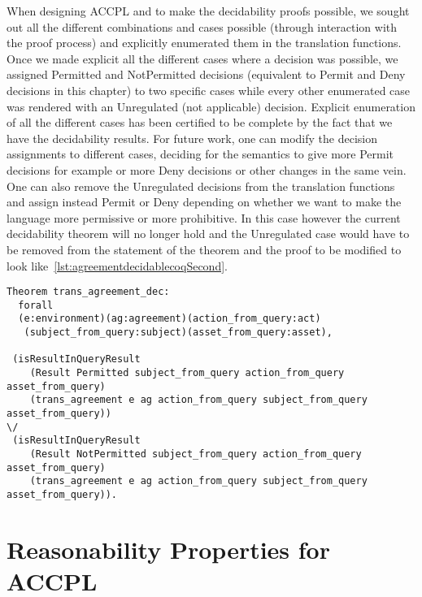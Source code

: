 When designing \ac{ACCPL} and to make the decidability proofs possible, we sought out all the different combinations and cases possible (through interaction with the proof process) and explicitly enumerated them in the translation functions. Once we made explicit all the different cases where a decision was possible, we assigned Permitted and NotPermitted decisions (equivalent to Permit and Deny decisions in this chapter) to two specific cases while every other enumerated case was rendered with an Unregulated (not applicable) decision. Explicit enumeration of all the different cases has been certified to be complete by the fact that we have the decidability results. For future work, one can modify the decision assignments to different cases, deciding for the semantics to give more Permit decisions for example or more Deny decisions or other changes in the same vein. One can also remove the Unregulated decisions from the translation functions and assign instead Permit or Deny depending on whether we want to make the language more permissive or more prohibitive. In this case however the current decidability theorem will no longer hold and the Unregulated case would have to be removed from the statement of the theorem and the proof to be modified to look like~\ref{lst:agreementdecidablecoqSecond}.

\begin{lstlisting}
Theorem trans_agreement_dec:
  forall
  (e:environment)(ag:agreement)(action_from_query:act)
   (subject_from_query:subject)(asset_from_query:asset),

 (isResultInQueryResult 
    (Result Permitted subject_from_query action_from_query asset_from_query)
    (trans_agreement e ag action_from_query subject_from_query asset_from_query)) 
\/
 (isResultInQueryResult 
    (Result NotPermitted subject_from_query action_from_query asset_from_query)
    (trans_agreement e ag action_from_query subject_from_query asset_from_query)).

\end{lstlisting}


\section{Reasonability Properties for ACCPL}

